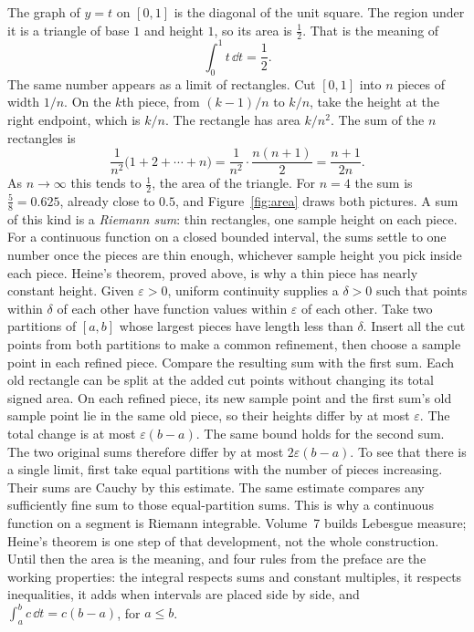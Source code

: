 The graph of $y=t$ on $[0,1]$ is the diagonal of the unit square. The region under it is a triangle of base $1$ and height $1$, so its area is $\frac12$. That is the meaning of
\[
\int_0^1 t\,\dd t=\frac12.
\]
The same number appears as a limit of rectangles. Cut $[0,1]$ into $n$ pieces of width $1/n$. On the $k$th piece, from $(k-1)/n$ to $k/n$, take the height at the right endpoint, which is $k/n$. The rectangle has area $k/n^2$. The sum of the $n$ rectangles is
\[
\frac1{n^2}\bigl(1+2+\cdots+n\bigr)=\frac1{n^2}\cdot\frac{n(n+1)}2=\frac{n+1}{2n}.
\]
As $n\to\infty$ this tends to $\frac12$, the area of the triangle. For $n=4$ the sum is $\frac58=0.625$, already close to $0.5$, and Figure~\ref{fig:area} draws both pictures. A sum of this kind is a \emph{Riemann sum}: thin rectangles, one sample height on each piece. For a continuous function on a closed bounded interval, the sums settle to one number once the pieces are thin enough, whichever sample height you pick inside each piece. Heine's theorem, proved above, is why a thin piece has nearly constant height. Given $\varepsilon>0$, uniform continuity supplies a $\delta>0$ such that points within $\delta$ of each other have function values within $\varepsilon$ of each other. Take two partitions of $[a,b]$ whose largest pieces have length less than $\delta$. Insert all the cut points from both partitions to make a common refinement, then choose a sample point in each refined piece. Compare the resulting sum with the first sum. Each old rectangle can be split at the added cut points without changing its total signed area. On each refined piece, its new sample point and the first sum's old sample point lie in the same old piece, so their heights differ by at most $\varepsilon$. The total change is at most $\varepsilon(b-a)$. The same bound holds for the second sum. The two original sums therefore differ by at most $2\varepsilon(b-a)$. To see that there is a single limit, first take equal partitions with the number of pieces increasing. Their sums are Cauchy by this estimate. The same estimate compares any sufficiently fine sum to those equal-partition sums. This is why a continuous function on a segment is Riemann integrable. Volume~7 builds Lebesgue measure; Heine's theorem is one step of that development, not the whole construction. Until then the area is the meaning, and four rules from the preface are the working properties: the integral respects sums and constant multiples, it respects inequalities, it adds when intervals are placed side by side, and $\int_a^b c\,\dd t=c(b-a)$, for $a\le b$.

